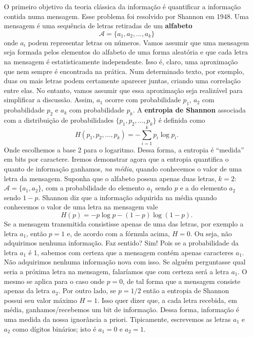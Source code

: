 \documentclass{article}
\begin{document}
O primeiro objetivo da teoria clássica da informação é quantificar a informação contida numa mensagem. Esse problema foi resolvido por Shannon em 1948. Uma mensagem é uma sequência de letras retiradas de um \textbf{alfabeto}
\begin{equation}
    \mathcal{A} = \{ a_1,a_2,...,a_k \}
\end{equation}
onde $a_i$ podem representar letras ou números. Vamos assumir que uma mensagem seja formada pelos elementos do alfabeto de uma forma aleatória e que cada letra na mensagem é estatisticamente independente. Isso é, claro, uma aproximação que nem sempre é encontrada na prática. Num determinado texto, por exemplo, duas ou mais letras podem certamente aparecer juntas, criando uma correlação entre elas. No entanto, vamos assumir que essa aproximação seja realizável para simplificar a discussão. Assim, $a_1$ ocorre com probabilidade $p_1$, $a_2$ com probabilidade $p_2$ e $a_k$ com probabilidade $p_k$. A \textbf{entropia de Shannon} associada com a distribuição de probabilidades $\{ p_1,p_2,...,p_k \}$ é definida como
\begin{equation}
    H(p_1,p_2,...,p_k) = -\sum_{i=1}^k p_i \log p_i.
\end{equation}
Onde escolhemos a base 2 para o logaritmo. Dessa forma, a entropia é ``medida'' em bits por caractere. Iremos demonstrar agora que a entropia quantifica o quanto de informação ganhamos, \textit{na média}, quando conhecemos o valor de uma letra da mensagem. Suponha que o alfabeto possua apenas duas letras, $k = 2$: $\mathcal{A} = \{ a_1,a_2 \}$, com a probabilidade do elemento $a_1$ sendo $p$ e a do elemento $a_2$ sendo $1-p$. Shannon diz que a informação adquirida na média quando conhecemos o valor de uma letra na mensagem vale
\begin{equation}
    H(p) = -p\log p - (1-p)\log (1-p).
\end{equation}
Se a mensagem transmitida consistisse apenas de uma das letras, por exemplo a letra $a_1$, então $p = 1$ e, de acordo com a fórmula acima, $H = 0$. Ou seja, não adquirimos nenhuma informação. Faz sentido? Sim! Pois se a probabilidade da letra $a_1$ é 1, sabemos com certeza que a mensagem contém apenas caracteres $a_1$. Não adquirimos nenhuma informação nova com isso. Se alguém perguntasse qual seria a próxima letra na mensagem, falaríamos que com certeza será a letra $a_1$. O mesmo se aplica para o caso onde $p = 0$, de tal forma que a mensagem consiste apenas da letra $a_2$. Por outro lado, se $p = 1/2$ então a entropia de Shannon possui seu valor máximo $H = 1$. Isso quer dizer que, a cada letra recebida, em média, ganhamos/recebemos um bit de informação. Dessa forma, informação é uma medida da nossa ignorância a priori. Tipicamente, escrevemos as letras $a_1$ e $a_2$ como dígitos binários; isto é $a_1 = 0$ e $a_2 = 1$.
\end{document}
